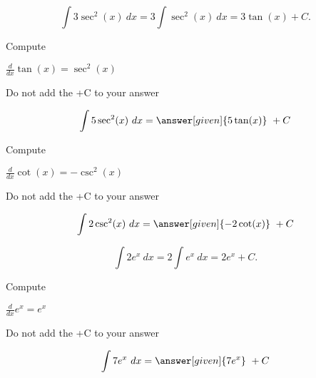 \documentclass{ximera}
\begin{document}
\begin{example} %
\[
\int 3\sec^2(x) \ dx = 3 \int \sec^2(x) \ dx = 3\tan(x) +C.
\]
\end{example}



\begin{problem} %
Compute

\begin{hint}
$\frac{d}{dx} \tan(x) = \sec^2(x)$
\end{hint}
\begin{hint}
\begin{center}
Do not add the +C to your answer
\end{center}
\end{hint}

\[
\int 5\sec^2(x) \ dx =
\answer[given]{5\tan(x)} \ +  C
\]
\end{problem}


\begin{problem} %
Compute

\begin{hint}
$\frac{d}{dx} \cot(x) = -\csc^2(x)$
\end{hint}
\begin{hint}
\begin{center}
Do not add the +C to your answer
\end{center}
\end{hint}

\[
\int 2\csc^2(x) \ dx =
\answer[given]{-2\cot(x)} \ +  C
\]
\end{problem}


\begin{example} %
\[
\int 2e^x \ dx = 2 \int e^x \ dx = 2e^x +C.
\]
\end{example}


\begin{problem} %
Compute

\begin{hint}
$\frac{d}{dx} e^x = e^x$
\end{hint}
\begin{hint}
\begin{center}
Do not add the +C to your answer
\end{center}
\end{hint}

\[
\int 7e^x \ dx =
\answer[given]{7e^x} \ +  C
\]
\end{problem}
\end{document}
